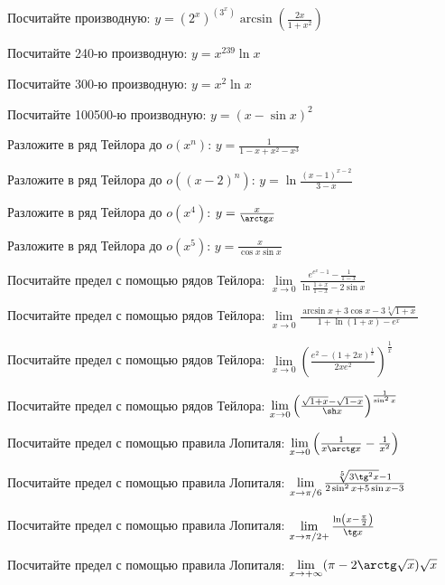 \documentclass[russian]{article}
\begin{document}
 
 Посчитайте производную:
 $y = (2^x)^{(3^x)} \arcsin \left(\frac{2x}{1 + x^2}\right)$
 
 Посчитайте 240-ю производную:
 $y = x^{239}\ln x$
 
 Посчитайте 300-ю производную:
 $y = x^2 \ln x$
 
 Посчитайте 100500-ю производную:
 $y = (x - \sin x)^2$
 
 
 Разложите в ряд Тейлора до $o(x^n)$:
 $y = \frac{1}{1 - x + x^2 - x^3}$
 
 Разложите в ряд Тейлора до $o((x - 2)^n)$:
 $y = \ln\frac{(x - 1)^{x - 2}}{3 - x}$
 
 Разложите в ряд Тейлора до $o(x^4)$:
 $y = \frac{x}{\arctg x}$
 
 Разложите в ряд Тейлора до $o(x^5)$:
 $y = \frac{x}{\cos x \sin x}$
 
 
 Посчитайте предел с помощью рядов Тейлора:
 $\lim\limits_{x \to 0} \frac{e^{e^x - 1} - \frac{1}{1 - x}}{\ln\frac{1 + x}{1 - x} - 2\sin x}$
 
 Посчитайте предел с помощью рядов Тейлора:
 $\lim\limits_{x \to 0} \frac{\arcsin x + 3 \cos x - 3\sqrt[3]{1 + x}}{1 + \ln(1 + x) - e^x}$
 
 Посчитайте предел с помощью рядов Тейлора:
 $\lim\limits_{x \to 0} \left(\frac{e^2 - (1 + 2x)^\frac{1}{x}}{2xe^2}\right)^\frac{1}{x}$
 
 Посчитайте предел с помощью рядов Тейлора:
 $\lim\limits_{x \to 0} \left( \frac{\sqrt{1 + x} - \sqrt{1 - x}}{\sh x} \right)^\frac{1}{\sin^2 x}$
 
 
 Посчитайте предел с помощью правила Лопиталя:
 $\lim\limits_{x \to 0} \left(\frac{1}{x\arctg x} - \frac{1}{x^2}\right)$
 
 Посчитайте предел с помощью правила Лопиталя:
 $\lim\limits_{x \to \pi/6} \frac{\sqrt[5]{3\tg^2 x} - 1}{2\sin^2 x + 5 \sin x - 3}$
 
 Посчитайте предел с помощью правила Лопиталя:
 $\lim\limits_{x \to \pi/2+} \frac{\ln\left(x - \frac{\pi}{2}\right)}{\tg x}$
 
 Посчитайте предел с помощью правила Лопиталя:
 $\lim\limits_{x \to +\infty} (\pi - 2 \arctg\sqrt{x})\sqrt{x}$
 
 
\end{document}
